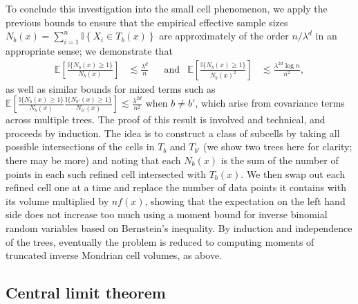 \documentclass[11pt,lof]{puthesis}
\newcommand{\E}{\ensuremath{\mathbb{E}}}
\newcommand{\I}{\ensuremath{\mathbb{I}}}
\theoremstyle{break}
\theoremstyle{proof}
\begin{document}
To conclude this investigation into the small cell phenomenon, we apply the
previous bounds to ensure that the empirical effective sample sizes
$N_b(x) = \sum_{i=1}^{n} \I \left\{ X_i \in T_b(x) \right\}$ are approximately
of the order $n / \lambda^d$ in an appropriate sense; we demonstrate that
%
\begin{align*}
  \E\left[ \frac{\I\{N_b(x) \geq 1\}}{N_b(x)} \right]
  &\lesssim \frac{\lambda^d}{n}
  &&\text{and}
  &\E\left[ \frac{\I\{N_b(x) \geq 1\}}{N_b(x)^2} \right]
  &\lesssim \frac{\lambda^{2d} \log n}{n^2},
\end{align*}
%
as well as similar bounds for mixed terms such as
%
$\E \left[
  \frac{\I\{N_b(x) \geq 1\}}{N_b(x)}
  \frac{\I\{N_{b'}(x) \geq 1\}}{N_{b'}(x)}
\right]
\lesssim \frac{\lambda^{2d}}{n^2}$
%
when $b \neq b'$, which arise from covariance terms across multiple trees. The
proof of this result is involved and technical, and proceeds by induction. The
idea is to construct a class of subcells by taking all possible intersections
of the cells in $T_b$ and $T_{b'}$ (we show two trees here for clarity; there
may be more) and noting that each $N_b(x)$ is the sum of the number of points
in each such refined cell intersected with $T_b(x)$. We then swap out each
refined cell one at a time and replace the number of data points it contains
with its volume multiplied by $n f(x)$, showing that the expectation on the
left hand side does not increase too much using a moment bound for inverse
binomial random variables based on Bernstein's inequality. By induction and
independence of the trees, eventually the problem is reduced to computing
moments of truncated inverse Mondrian cell volumes, as above.

\subsection*{Central limit theorem}
\end{document}
